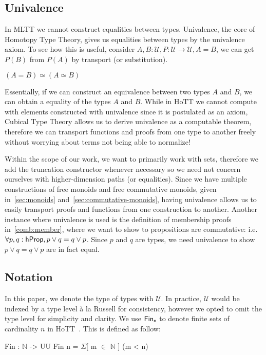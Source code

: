 \subsection{Univalence}\label{types:univalence}
In MLTT we cannot construct equalities between types. Univalence, the core of Homotopy Type Theory,
gives us equalities between types by the univalence axiom. To see how this is useful,
consider $A, B : \mathcal{U}, P : \mathcal{U} \rightarrow \mathcal{U}, A = B$, we can
get $P(B)$ from $P(A)$ by transport (or substitution).  

\begin{definition}
    $(A = B) \simeq (A \simeq B)$
\end{definition}
Essentially, if we can construct an equivalence between two types $A$ and $B$,
we can obtain a equality of the types $A$ and $B$. While in HoTT we cannot
compute with elements constructed with univalence since it is postulated as an
axiom, Cubical Type Theory allows us to derive univalence as a computable
theorem, therefore we can transport functions and proofs from one type to
another freely without worrying about terms not being able to normalize!

Within the scope of our work, we want to primarily work with
sets, therefore we add the truncation constructor whenever necessary so we need not concern ourselves
with higher-dimension paths (or equalities). Since we have multiple constructions of free monoids
and free commutative monoids, given in~\cref{sec:monoids} and~\cref{sec:commutative-monoids},
having univalence allows us to easily transport proofs and functions from one construction to another.
Another instance where univalence is used is the definition of membership proofs in~\cref{comb:member},
where we want to show to propositions are commutative: i.e. $\forall p, q: \mathsf{hProp}, p \vee q = q \vee p$.
Since $p$ and $q$ are types, we need univalence to show $p \vee q = q \vee p$ are in fact equal.

\subsection{Notation}
In this paper, we denote the type of types with $\mathcal{U}$. 
In practice, $\mathcal{U}$ would be indexed by a type level 
à la Russell for consistency, however we opted to omit the type level
for simplicity and clarity.
We use $\Fin[n]$ to denote finite sets of cardinality $n$ in HoTT~\cite{yorgeyCombinatorialSpeciesLabelled2014a}.
This is defined as follow:
\vspace{-1em}
\begin{code}
Fin : $\mathbb{N}$ -> UU
Fin n = $\Sigma$[ m $\in$ $\mathbb{N}$ ] (m < n)
\end{code}

